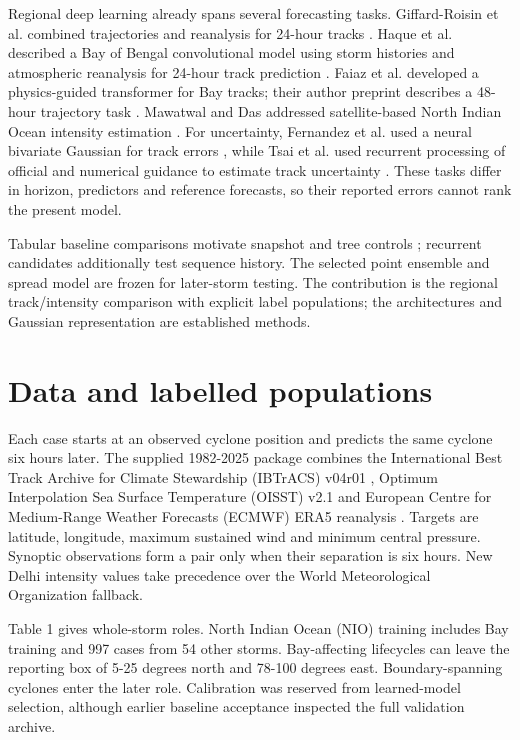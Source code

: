 \documentclass[pdflatex,sn-mathphys-num,referee,a4paper]{sn-jnl}
\begin{document}
Regional deep learning already spans several forecasting tasks. Giffard-Roisin et al. combined trajectories and reanalysis for 24-hour tracks \cite{giffard2020}. Haque et al. described a Bay of Bengal convolutional model using storm histories and atmospheric reanalysis for 24-hour track prediction \cite{haque2026}. Faiaz et al. developed a physics-guided transformer for Bay tracks; their author preprint describes a 48-hour trajectory task \cite{faiaz2026}. Mawatwal and Das addressed satellite-based North Indian Ocean intensity estimation \cite{mawatwal2024}. For uncertainty, Fernandez et al. used a neural bivariate Gaussian for track errors \cite{fernandez2025}, while Tsai et al. used recurrent processing of official and numerical guidance to estimate track uncertainty \cite{tsai2026}. These tasks differ in horizon, predictors and reference forecasts, so their reported errors cannot rank the present model.

Tabular baseline comparisons motivate snapshot and tree controls \cite{gorishniy2021}; recurrent candidates additionally test sequence history. The selected point ensemble and spread model are frozen for later-storm testing. The contribution is the regional track/intensity comparison with explicit label populations; the architectures and Gaussian representation are established methods.


\section{Data and labelled populations}
Each case starts at an observed cyclone position and predicts the same cyclone six hours later. The supplied 1982-2025 package combines the International Best Track Archive for Climate Stewardship (IBTrACS) v04r01 \cite{knapp2010,gahtan2024}, Optimum Interpolation Sea Surface Temperature (OISST) v2.1 \cite{huang2021} and European Centre for Medium-Range Weather Forecasts (ECMWF) ERA5 reanalysis \cite{hersbach2020}. Targets are latitude, longitude, maximum sustained wind and minimum central pressure. Synoptic observations form a pair only when their separation is six hours. New Delhi intensity values take precedence over the World Meteorological Organization fallback.

Table 1 gives whole-storm roles. North Indian Ocean (NIO) training includes Bay training and 997 cases from 54 other storms. Bay-affecting lifecycles can leave the reporting box of 5-25 degrees north and 78-100 degrees east. Boundary-spanning cyclones enter the later role. Calibration was reserved from learned-model selection, although earlier baseline acceptance inspected the full validation archive.
\end{document}
